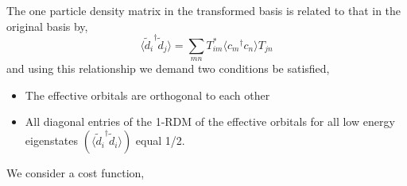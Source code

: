 The one particle density matrix in the transformed basis is related 
to that in the original basis by,
\begin{equation}
	\langle {\tilde{d}_i}^{\dagger} \tilde{d}_{j} \rangle = \sum_{mn} T^{*}_{im} \langle {c_m}^{\dagger} c_n \rangle T_{jn}
\end{equation}
and using this relationship we demand two conditions be satisfied,
\begin{itemize} 
 \item The effective orbitals are orthogonal to each other 
 \item All diagonal entries of the 1-RDM of the effective orbitals for all low energy eigenstates 
       $(\langle {\tilde{d}_i}^{\dagger} \tilde{d}_{i} \rangle)$ 
       equal 1/2.
\end{itemize} 
We consider a cost function, 

